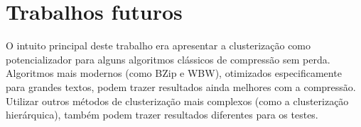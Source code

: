 \section{Trabalhos futuros}
O intuito principal deste trabalho era apresentar a clusterização como potencializador para alguns algoritmos clássicos de compressão sem perda.
Algoritmos mais modernos (como BZip e WBW), otimizados especificamente para grandes textos, podem trazer resultados ainda melhores com a compressão.
Utilizar outros métodos de clusterização mais complexos (como a clusterização hierárquica), também podem trazer resultados diferentes para os testes.
